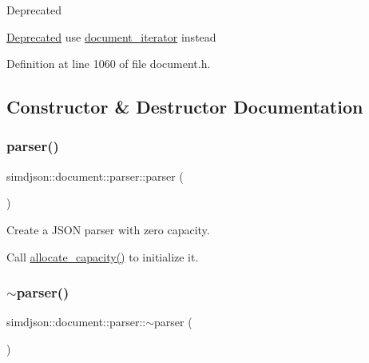 \begin{DoxyRefDesc}{Deprecated}
\item[\hyperlink{deprecated__deprecated000001}{Deprecated}]use \hyperlink{classsimdjson_1_1document__iterator}{document\+\_\+iterator} instead \end{DoxyRefDesc}


Definition at line 1060 of file document.\+h.



\subsection{Constructor \& Destructor Documentation}
\mbox{\label{classsimdjson_1_1document_1_1parser_a656d0ad716faf5085e885581ec598466}} 
\subsubsection{\texorpdfstring{parser()}{parser()}\hspace{0.1cm}{\footnotesize\ttfamily [1/2]}}
{\footnotesize\ttfamily simdjson\+::document\+::parser\+::parser (\begin{DoxyParamCaption}{ }\end{DoxyParamCaption})\hspace{0.3cm}{\ttfamily [default]}}



Create a J\+S\+ON parser with zero capacity. 

Call \hyperlink{classsimdjson_1_1document_1_1parser_af1e347c307036b644ed92f8bb575c4e9}{allocate\+\_\+capacity()} to initialize it. \mbox{\label{classsimdjson_1_1document_1_1parser_a01e70a75fd87c764982b9e5f4e87eddf}} 
\subsubsection{\texorpdfstring{$\sim$parser()}{~parser()}}
{\footnotesize\ttfamily simdjson\+::document\+::parser\+::$\sim$parser (\begin{DoxyParamCaption}{ }\end{DoxyParamCaption})\hspace{0.3cm}{\ttfamily [default]}}



